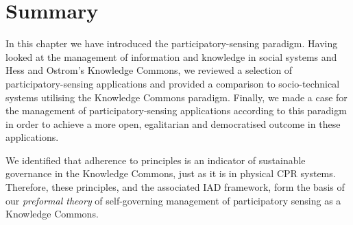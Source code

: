 \section{Summary}

In this chapter we have introduced the participatory-sensing paradigm. Having
looked at the management of information and knowledge in social systems and
Hess and Ostrom's Knowledge Commons, we reviewed a selection of 
participatory-sensing applications and provided a comparison to socio-technical systems
utilising the Knowledge Commons paradigm. Finally, we made a case for the
management of participatory-sensing applications according to this paradigm in
order to achieve a more open, egalitarian and democratised outcome in these
applications.

We identified that adherence to  principles is an
indicator of sustainable governance in the Knowledge Commons, just as it is in
physical \ac{CPR} systems. Therefore, these principles, and the associated
\ac{IAD} framework, form the basis of our \emph{preformal theory} of self-governing
management of participatory sensing as a Knowledge Commons.




